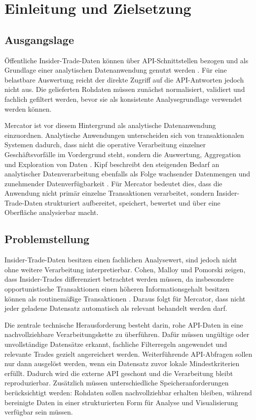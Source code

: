 \section{Einleitung und Zielsetzung}

\subsection{Ausgangslage}

Öffentliche Insider-Trade-Daten können über API-Schnittstellen bezogen und als Grundlage einer analytischen Datenanwendung genutzt werden \parencite{fmp_docs}. Für eine belastbare Auswertung reicht der direkte Zugriff auf die API-Antworten jedoch nicht aus. Die gelieferten Rohdaten müssen zunächst normalisiert, validiert und fachlich gefiltert werden, bevor sie als konsistente Analysegrundlage verwendet werden können.

Mercator ist vor diesem Hintergrund als analytische Datenanwendung einzuordnen. Analytische Anwendungen unterscheiden sich von transaktionalen Systemen dadurch, dass nicht die operative Verarbeitung einzelner Geschäftsvorfälle im Vordergrund steht, sondern die Auswertung, Aggregation und Exploration von Daten \parencite{ibm_olap_oltp}. Kipf beschreibt den steigenden Bedarf an analytischer Datenverarbeitung ebenfalls als Folge wachsender Datenmengen und zunehmender Datenverfügbarkeit \parencite{kipf_2020_analytical_database_systems}. Für Mercator bedeutet dies, dass die Anwendung nicht primär einzelne Transaktionen verarbeitet, sondern Insider-Trade-Daten strukturiert aufbereitet, speichert, bewertet und über eine Oberfläche analysierbar macht.

\subsection{Problemstellung}

Insider-Trade-Daten besitzen einen fachlichen Analysewert, sind jedoch nicht ohne weitere Verarbeitung interpretierbar. Cohen, Malloy und Pomorski zeigen, dass Insider-Trades differenziert betrachtet werden müssen, da insbesondere opportunistische Transaktionen einen höheren Informationsgehalt besitzen können als routinemäßige Transaktionen \parencite{cohen_malloy_pomorski_2012}. Daraus folgt für Mercator, dass nicht jeder geladene Datensatz automatisch als relevant behandelt werden darf.

Die zentrale technische Herausforderung besteht darin, rohe API-Daten in eine nachvollziehbare Verarbeitungskette zu überführen. Dafür müssen ungültige oder unvollständige Datensätze erkannt, fachliche Filterregeln angewendet und relevante Trades gezielt angereichert werden. Weiterführende API-Abfragen sollen nur dann ausgelöst werden, wenn ein Datensatz zuvor lokale Mindestkriterien erfüllt. Dadurch wird die externe API geschont und die Verarbeitung bleibt reproduzierbar. Zusätzlich müssen unterschiedliche Speicheranforderungen berücksichtigt werden: Rohdaten sollen nachvollziehbar erhalten bleiben, während bereinigte Daten in einer strukturierten Form für Analyse und Visualisierung verfügbar sein müssen.

